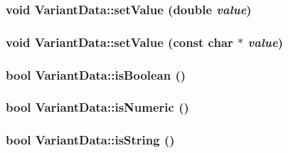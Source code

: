 \hypertarget{classVariantData_4bb158230df201cbba62f3274bf67bf2}{
\subsubsection[{setValue}]{\setlength{\rightskip}{0pt plus 5cm}void VariantData::setValue (double {\em value})}}
\label{classVariantData_4bb158230df201cbba62f3274bf67bf2}


\hypertarget{classVariantData_85c6fb4d9c36148288216e2fcc6a34b4}{
\subsubsection[{setValue}]{\setlength{\rightskip}{0pt plus 5cm}void VariantData::setValue (const char $\ast$ {\em value})}}
\label{classVariantData_85c6fb4d9c36148288216e2fcc6a34b4}


\hypertarget{classVariantData_7f93c9a6ba029700231cb457b96408b1}{
\subsubsection[{isBoolean}]{\setlength{\rightskip}{0pt plus 5cm}bool VariantData::isBoolean ()}}
\label{classVariantData_7f93c9a6ba029700231cb457b96408b1}


\hypertarget{classVariantData_f521379b31650cd5fb8f35fd029967f7}{
\subsubsection[{isNumeric}]{\setlength{\rightskip}{0pt plus 5cm}bool VariantData::isNumeric ()}}
\label{classVariantData_f521379b31650cd5fb8f35fd029967f7}


\hypertarget{classVariantData_add04c5ac48a44ad1c26ab6bf2099f4b}{
\subsubsection[{isString}]{\setlength{\rightskip}{0pt plus 5cm}bool VariantData::isString ()}}
\label{classVariantData_add04c5ac48a44ad1c26ab6bf2099f4b}


